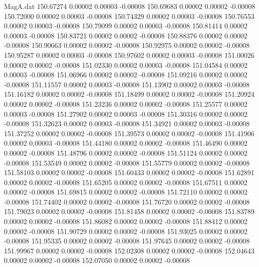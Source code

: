\begin{filecontents}{MagA.dat}
 150.67274    0.00002    0.00003   -0.00008
 150.69683    0.00002    0.00002   -0.00008
 150.72000    0.00002    0.00003   -0.00008
 150.74329    0.00002    0.00003   -0.00008
 150.76553    0.00002    0.00003   -0.00008
 150.79099    0.00002    0.00003   -0.00008
 150.81414    0.00002    0.00003   -0.00008
 150.83721    0.00002    0.00002   -0.00008
 150.88376    0.00002    0.00002   -0.00008
 150.90663    0.00002    0.00002   -0.00008
 150.92975    0.00002    0.00002   -0.00008
 150.95287    0.00002    0.00003   -0.00008
 150.97602    0.00002    0.00003   -0.00008
 151.00026    0.00002    0.00002   -0.00008
 151.02330    0.00002    0.00003   -0.00008
 151.04584    0.00002    0.00003   -0.00008
 151.06966    0.00002    0.00002   -0.00008
 151.09216    0.00002    0.00002   -0.00008
 151.11557    0.00002    0.00003   -0.00008
 151.13902    0.00002    0.00003   -0.00008
 151.16182    0.00002    0.00002   -0.00008
 151.18499    0.00002    0.00002   -0.00008
 151.20924    0.00002    0.00002   -0.00008
 151.23236    0.00002    0.00002   -0.00008
 151.25577    0.00002    0.00003   -0.00008
 151.27902    0.00002    0.00003   -0.00008
 151.30316    0.00002    0.00002   -0.00008
 151.32623    0.00002    0.00003   -0.00008
 151.34921    0.00002    0.00003   -0.00008
 151.37252    0.00002    0.00002   -0.00008
 151.39573    0.00002    0.00002   -0.00008
 151.41906    0.00002    0.00003   -0.00008
 151.44180    0.00002    0.00002   -0.00008
 151.46490    0.00002    0.00002   -0.00008
 151.48796    0.00002    0.00002   -0.00008
 151.51124    0.00002    0.00002   -0.00008
 151.53549    0.00002    0.00002   -0.00008
 151.55779    0.00002    0.00002   -0.00008
 151.58103    0.00002    0.00002   -0.00008
 151.60433    0.00002    0.00002   -0.00008
 151.62891    0.00002    0.00002   -0.00008
 151.65205    0.00002    0.00002   -0.00008
 151.67511    0.00002    0.00002   -0.00008
 151.69815    0.00002    0.00002   -0.00008
 151.72110    0.00002    0.00002   -0.00008
 151.74402    0.00002    0.00002   -0.00008
 151.76720    0.00002    0.00002   -0.00008
 151.79023    0.00002    0.00002   -0.00008
 151.81458    0.00002    0.00002   -0.00008
 151.83789    0.00002    0.00002   -0.00008
 151.86082    0.00002    0.00002   -0.00008
 151.88412    0.00002    0.00002   -0.00008
 151.90729    0.00002    0.00002   -0.00008
 151.93025    0.00002    0.00002   -0.00008
 151.95335    0.00002    0.00002   -0.00008
 151.97645    0.00002    0.00002   -0.00008
 151.99967    0.00002    0.00002   -0.00008
 152.02308    0.00002    0.00002   -0.00008
 152.04643    0.00002    0.00002   -0.00008
 152.07050    0.00002    0.00002   -0.00008

\end{filecontents}
